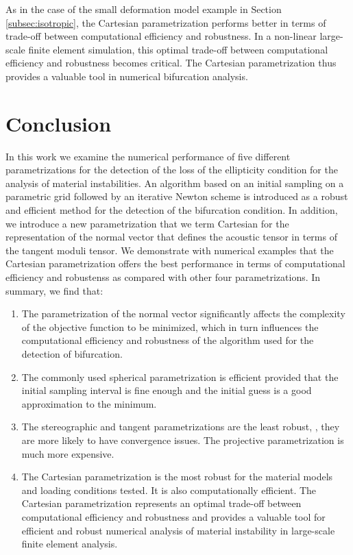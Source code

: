 \documentclass[12pt]{article}
\numberwithin{equation}{section}
\begin{document}
As in the case of the small deformation model example in Section
\ref{subsec:isotropic}, the Cartesian parametrization performs better
in terms of trade-off between computational efficiency and
robustness. In a non-linear large-scale finite element simulation,
this optimal trade-off between computational efficiency and robustness
becomes critical. The Cartesian parametrization thus provides a
valuable tool in numerical bifurcation analysis.

\section{Conclusion}

In this work we examine the numerical performance of five different
parametrizations for the detection of the loss of the ellipticity
condition for the analysis of material instabilities. An algorithm
based on an initial sampling on a parametric grid followed by an
iterative Newton scheme is introduced as a robust and efficient method
for the detection of the bifurcation condition. In addition, we
introduce a new parametrization that we term Cartesian for the
representation of the normal vector that defines the acoustic tensor
in terms of the tangent moduli tensor. We demonstrate with numerical
examples that the Cartesian parametrization offers the best
performance in terms of computational efficiency and robustenss as
compared with other four parametrizations. In summary, we find that:

\begin{enumerate}
\item
The parametrization of the normal vector significantly affects the
complexity of the objective function to be minimized, which in turn
influences the computational efficiency and robustness of the
algorithm used for the detection of bifurcation.

\item
The commonly used spherical parametrization is efficient provided
that the initial sampling interval is fine enough and the initial
guess is a good approximation to the minimum.

\item
The stereographic and tangent parametrizations are the least
robust, \ie, they are more likely to have convergence issues. The
projective parametrization is much more expensive.

\item
The Cartesian parametrization is the most robust for the material
models and loading conditions tested. It is also computationally
efficient. The Cartesian parametrization represents an optimal
trade-off between computational efficiency and robustness and provides
a valuable tool for efficient and robust numerical analysis of
material instability in large-scale finite element analysis.
\end{enumerate}



\end{document}
